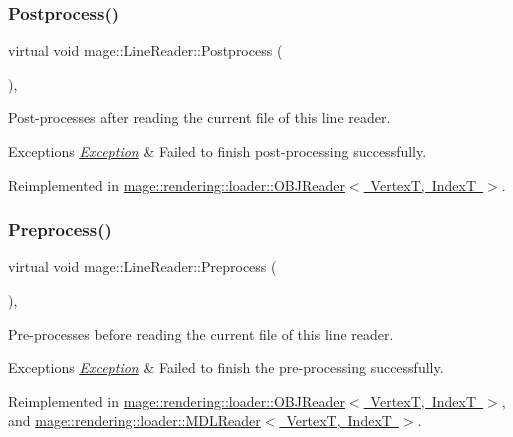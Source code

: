 \subsubsection{\texorpdfstring{Postprocess()}{Postprocess()}}
{\footnotesize\ttfamily virtual void mage\+::\+Line\+Reader\+::\+Postprocess (\begin{DoxyParamCaption}{ }\end{DoxyParamCaption})\hspace{0.3cm}{\ttfamily [private]}, {\ttfamily [virtual]}}

Post-\/processes after reading the current file of this line reader.


\begin{DoxyExceptions}{Exceptions}
{\em \mbox{\hyperlink{classmage_1_1_exception}{Exception}}} & Failed to finish post-\/processing successfully. \\
\hline
\end{DoxyExceptions}


Reimplemented in \mbox{\hyperlink{classmage_1_1rendering_1_1loader_1_1_o_b_j_reader_a281c16ef7d20a7c1416923f3cadee33a}{mage\+::rendering\+::loader\+::\+O\+B\+J\+Reader$<$ Vertex\+T, Index\+T $>$}}.

\mbox{\label{classmage_1_1_line_reader_a4de135cfb0434be786cfcfd7959031ef}} 
\subsubsection{\texorpdfstring{Preprocess()}{Preprocess()}}
{\footnotesize\ttfamily virtual void mage\+::\+Line\+Reader\+::\+Preprocess (\begin{DoxyParamCaption}{ }\end{DoxyParamCaption})\hspace{0.3cm}{\ttfamily [private]}, {\ttfamily [virtual]}}

Pre-\/processes before reading the current file of this line reader.


\begin{DoxyExceptions}{Exceptions}
{\em \mbox{\hyperlink{classmage_1_1_exception}{Exception}}} & Failed to finish the pre-\/processing successfully. \\
\hline
\end{DoxyExceptions}


Reimplemented in \mbox{\hyperlink{classmage_1_1rendering_1_1loader_1_1_o_b_j_reader_ad082a6295259f7e8af2c60c182ea55d3}{mage\+::rendering\+::loader\+::\+O\+B\+J\+Reader$<$ Vertex\+T, Index\+T $>$}}, and \mbox{\hyperlink{classmage_1_1rendering_1_1loader_1_1_m_d_l_reader_a397f0c0eedc56c983fc3a7074aa4e577}{mage\+::rendering\+::loader\+::\+M\+D\+L\+Reader$<$ Vertex\+T, Index\+T $>$}}.


